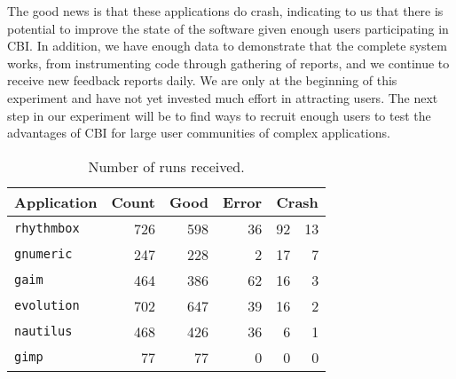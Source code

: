 \documentclass[10pt,twocolumn]{article}
\newcommand{\evolution}{\texttt{evolution}\xspace}
\newcommand{\gaim}{\texttt{gaim}\xspace}
\newcommand{\gimp}{\texttt{gimp}\xspace}
\newcommand{\gnumeric}{\texttt{gnumeric}\xspace}
\newcommand{\nautilus}{\texttt{nautilus}\xspace}
\newcommand{\rhythmbox}{\texttt{rhythmbox}\xspace}
\newcommand{\header}[1]{\multicolumn{1}{c}{#1}}
\begin{document}
The good news is that these applications do crash,
indicating to us that there is potential to improve the state
of the software given enough users participating in CBI.  In addition,
we have enough data to demonstrate that the complete system works, from
instrumenting code through gathering of reports, and we continue to
receive new feedback reports daily.  We are only at the beginning of this
experiment and have not yet invested much effort in attracting users. 
The next step in our experiment will be
to find ways to recruit enough users to test the advantages of CBI
for large user communities of complex applications.


\begin{table}
  \centering
  \begin{tabular}{lrrrr@{ (}r@{\%)}}
    \header{Application} & \header{Count} & \header{Good} & \header{Error} & \multicolumn{2}{c}{Crash} \\ \hline
    \rhythmbox & 726 & 598 & 36 & 92 & 13 \\
    \gnumeric & 247 & 228 & 2 & 17 & 7 \\
    \gaim & 464 & 386 & 62 & 16 & 3 \\
    \evolution & 702 & 647 & 39 & 16 & 2 \\
    \nautilus & 468 & 426 & 36 & 6 & 1 \\
    \gimp & 77 & 77 & 0 & 0 & 0
  \end{tabular}
  \caption{Number of runs received.}
  \label{reports-per-app}
\end{table}


\end{document}
